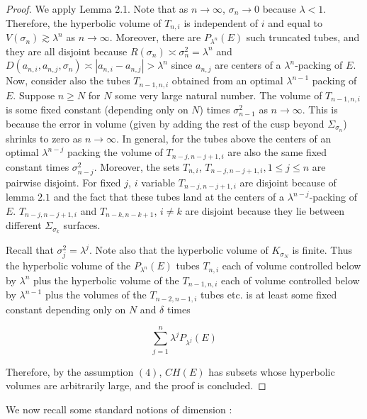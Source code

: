 \documentclass[11pt]{article}
\begin{document}
\begin{proof}
    We apply Lemma 2.1. Note that as $n \rightarrow \infty$, $\sigma_n \rightarrow 0$ because $\lambda < 1$. Therefore, the hyperbolic volume of $T_{n,i}$ is independent of $i$ and equal to $V(\sigma_n) \gtrsim \lambda^n$ as $n \rightarrow \infty$. Moreover, there are $P_{\lambda^n}(E)$ such truncated tubes, and they are all disjoint because $R(\sigma_n) \asymp \sigma_n^2 = \lambda^n$ and $D(a_{n,i}, a_{n,j}, \sigma_n) \asymp |a_{n,i} - a_{n,j}| > \lambda^n$ since $a_{n,j}$ are centers of a $\lambda^n$-packing of $E$. Now, consider also the tubes $T_{n-1,n, i}$ obtained from an optimal $\lambda^{n-1}$ packing of $E$. Suppose $n \geq N$ for $N$ some very large natural number. The volume of $T_{n-1, n,i}$ is some fixed constant (depending only on $N$) times $\sigma_{n-1}^2$ as $n \rightarrow \infty$. This is because the error in volume (given by adding the rest of the cusp beyond $\Sigma_{\sigma_n}$) shrinks to zero as $n \rightarrow \infty$. In general, for the tubes above the centers of an optimal $\lambda^{n-j}$ packing the volume of $T_{n-j, n-j+1, i}$ are also the same fixed constant times $\sigma_{n-j}^2$. Moreover, the sets $T_{n,i}$, $T_{n-j, n-j+1,i}, 1 \leq j \leq n$ are pairwise disjoint. For fixed $j$, $i$ variable $T_{n-j, n-j+1,i}$ are disjoint because of lemma $2.1$ and the fact that these tubes land at the centers of a $\lambda^{n-j}$-packing of $E$. $T_{n - j, n-j+1,i}$ and $T_{n-k, n-k+1}$, $i \neq k$ are disjoint because they lie between different $\Sigma_{\sigma_k}$ surfaces. 

    \bigskip
    
    Recall that $\sigma_j^2 = \lambda^j$. Note also that the hyperbolic volume of $K_{\sigma_N}$ is finite. Thus the hyperbolic volume of the $P_{\lambda^n}(E)$ tubes $T_{n,i}$ each of volume controlled below by  $\lambda^n$ plus the hyperbolic volume of the  $T_{n-1, n, i}$  each of volume controlled below by  $\lambda^{n-1}$ plus the volumes of the $T_{n-2, n-1, i}$ tubes etc. is at least some fixed constant depending only on $N$ and $\delta$ times

     $$\sum_{j = 1}^n \lambda^j P_{\lambda^j}(E)$$

    Therefore, by the assumption $(4)$, $CH(E)$ has subsets whose hyperbolic volumes are arbitrarily large, and the proof is concluded.
    \end{proof}

    \bigskip

    We now recall some standard notions of dimension \cite{mat}:
\end{document}
